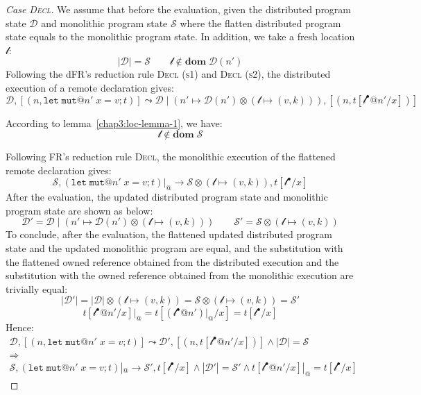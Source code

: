 \begin{proof}[Case \textsc{\emph{Decl}}]
We assume that before the evaluation, given the distributed program state $\mathcal{D}$ and monolithic program state $\mathcal{S}$ where the flatten distributed program state equals to the monolithic program state. In addition, we take a fresh location $\mathscr{l}$:
\[
|\mathcal{D}| = \mathcal{S} \quad\quad \mathscr{l} \notin \textbf{dom}\; \mathcal{D}(n')
\]
Following the dFR's reduction rule \textsc{Decl (s1)} and \textsc{Decl (s2)}, the distributed execution of a remote declaration gives:
\[
\mathcal{D}, [(n, \texttt{let}\;\texttt{mut}@n'\;x = v;t)] \leadsto \mathcal{D} \mid (n' \mapsto \mathcal{D}(n')\otimes(\mathscr{l} \mapsto (v, k))), [(n, t[\mathscr{l}^\bullet@n'/x])]
\]
\begin{highlightnew}
According to lemma~\ref{chap3:loc-lemma-1}, we have:
\[\mathscr{l} \notin \textbf{dom}\; \mathcal{S}\] 
\end{highlightnew}
Following FR's reduction rule \textsc{Decl}, the monolithic execution of the flattened remote declaration gives:
\[
\mathcal{S}, (\texttt{let}\;\texttt{mut}@n'\;x = v;t)|_@ \longrightarrow \mathcal{S} \otimes (\mathscr{l} \mapsto (v, k)), t[\mathscr{l}^\bullet/x]
\]
After the evaluation, the updated distributed program state and monolithic program state are shown as below:
\[
\mathcal{D}' = \mathcal{D} \mid (n' \mapsto \mathcal{D}(n')\otimes(\mathscr{l} \mapsto (v, k))) \quad\quad
\mathcal{S}' = \mathcal{S} \otimes (\mathscr{l} \mapsto (v, k))
\]
To conclude, after the evaluation, the flattened updated distributed program state and the updated monolithic program are equal, and the substitution with the flattened owned reference obtained from the distributed execution and the substitution with the owned reference obtained from the monolithic execution are trivially equal:
\[
|\mathcal{D}'| = |\mathcal{D}| \otimes (\mathscr{l} \mapsto (v, k)) = \mathcal{S} \otimes (\mathscr{l} \mapsto (v, k)) = \mathcal{S}'\]\[ t[\mathscr{l}^\bullet@n'/x]|_@ = t[(\mathscr{l}^\bullet@n')|_@/x] = t[\mathscr{l}^\bullet/x]
\]
Hence:
\begin{gather*}
\mathcal{D}, [(n, \texttt{let}\;\texttt{mut}@n'\;x = v;t)] \leadsto \mathcal{D'}, [(n, t[\mathscr{l}^\bullet@n'/x])] \land |\mathcal{D}| = \mathcal{S} \\\Rightarrow\\ \mathcal{S}, (\texttt{let}\;\texttt{mut}@n'\;x = v;t)|_@ \longrightarrow \mathcal{S'}, t[\mathscr{l}^\bullet/x] \land |\mathcal{D}'| = \mathcal{S}' \land t[\mathscr{l}^\bullet@n'/x]|_@ = t[\mathscr{l}^\bullet/x]

\end{gather*}
\end{proof}
